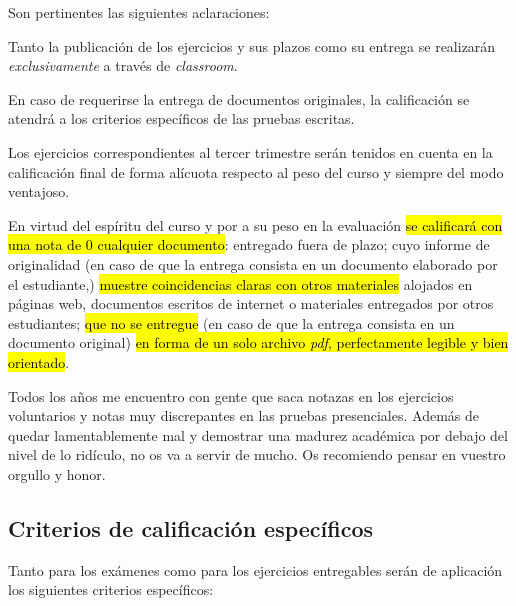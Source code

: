 \documentclass[a5paper,12pt]{extarticle}
\begin{document}
Son pertinentes las siguientes aclaraciones:
  \begin{itemize}
  {\footnotesize
    \item Tanto la publicación de los ejercicios y sus plazos como su entrega se realizarán \textit{exclusivamente} a través de \textit{classroom}. 
    \item 	En caso de requerirse la entrega de documentos originales, la calificación se atendrá a los criterios específicos de las pruebas escritas.
    \item Los ejercicios correspondientes al tercer trimestre serán tenidos en cuenta en la calificación final de forma alícuota respecto al peso del curso y siempre del modo ventajoso.
    \item En virtud del espíritu del curso y por a su peso en la evaluación  \hl{se calificar\'a con una nota de $0$ cualquier documento}: entregado fuera de plazo; cuyo informe de originalidad (en caso de que la entrega consista en un documento elaborado por el estudiante,) \hl{muestre coincidencias claras con otros materiales} alojados en páginas web,  documentos escritos de internet o materiales entregados por otros estudiantes;  \hl{que no se entregue} (en caso de que la entrega consista en un documento original) \hl{en forma de un solo archivo \textit{pdf}, perfectamente legible y bien orientado}.
    }
  \end{itemize}
	\vspace{2ex}
	
	Todos los años me encuentro con gente que saca notazas en los ejercicios voluntarios y notas muy discrepantes en las pruebas presenciales. Además de quedar lamentablemente mal y demostrar una madurez académica por debajo del nivel de lo ridículo, no os va a servir de mucho. Os recomiendo pensar en vuestro orgullo y honor.
	
		
	\subsection{Criterios de calificación específicos}

Tanto para los exámenes como para los ejercicios entregables serán de aplicación los siguientes criterios específicos: 

	\vspace{2ex}
	
\end{document}
